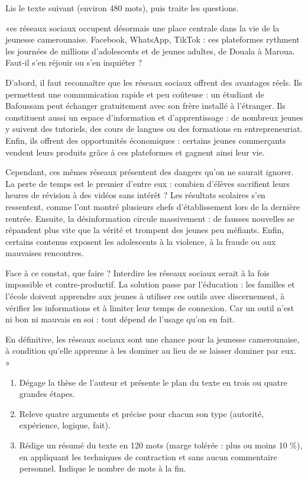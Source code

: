 \documentclass[11pt]{article}
\begin{document}
\begin{exercice}
Lis le texte suivant (environ 480 mots), puis traite les questions.

\begin{itshape}«es réseaux sociaux occupent désormais une place centrale dans la vie de la jeunesse camerounaise. Facebook, WhatsApp, TikTok : ces plateformes rythment les journées de millions d'adolescents et de jeunes adultes, de Douala à Maroua. Faut-il s'en réjouir ou s'en inquiéter ?

D'abord, il faut reconnaître que les réseaux sociaux offrent des avantages réels. Ils permettent une communication rapide et peu coûteuse : un étudiant de Bafoussam peut échanger gratuitement avec son frère installé à l'étranger. Ils constituent aussi un espace d'information et d'apprentissage : de nombreux jeunes y suivent des tutoriels, des cours de langues ou des formations en entrepreneuriat. Enfin, ils offrent des opportunités économiques : certains jeunes commerçants vendent leurs produits grâce à ces plateformes et gagnent ainsi leur vie.

Cependant, ces mêmes réseaux présentent des dangers qu'on ne saurait ignorer. La perte de temps est le premier d'entre eux : combien d'élèves sacrifient leurs heures de révision à des vidéos sans intérêt ? Les résultats scolaires s'en ressentent, comme l'ont montré plusieurs chefs d'établissement lors de la dernière rentrée. Ensuite, la désinformation circule massivement : de fausses nouvelles se répandent plus vite que la vérité et trompent des jeunes peu méfiants. Enfin, certains contenus exposent les adolescents à la violence, à la fraude ou aux mauvaises rencontres.

Face à ce constat, que faire ? Interdire les réseaux sociaux serait à la fois impossible et contre-productif. La solution passe par l'éducation : les familles et l'école doivent apprendre aux jeunes à utiliser ces outils avec discernement, à vérifier les informations et à limiter leur temps de connexion. Car un outil n'est ni bon ni mauvais en soi : tout dépend de l'usage qu'on en fait.

En définitive, les réseaux sociaux sont une chance pour la jeunesse camerounaise, à condition qu'elle apprenne à les dominer au lieu de se laisser dominer par eux. »\end{itshape}

\begin{enumerate}
\item Dégage la thèse de l'auteur et présente le plan du texte en trois ou quatre grandes étapes.
\item Releve quatre arguments et précise pour chacun son type (autorité, expérience, logique, fait).
\item Rédige un résumé du texte en 120 mots (marge tolérée : plus ou moins 10 \%), en appliquant les techniques de contraction et sans aucun commentaire personnel. Indique le nombre de mots à la fin.
\end{enumerate}
\end{exercice}
\end{document}
